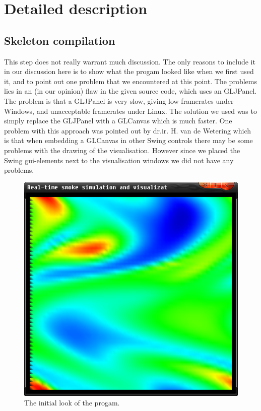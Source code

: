 \documentclass[a4paper,11pt,twoside]{report}
\begin{document}
\chapter{Detailed description}\label{detaileddescription}
	\section{Skeleton compilation}
		This step does not really warrant much discussion. The only reasons to include it in our discussion here is to show what the progam looked like when we first used it, and to point out one problem that we encountered at this point. The problems lies in an (in our opinion) flaw in the given source code, which uses an GLJPanel. The problem is that a GLJPanel is very slow, giving low framerates under Windows, and unacceptable framerates  under Linux. The solution we used was to simply replace the GLJPanel with a GLCanvas which is much faster. One problem with this approach was pointed out by dr.ir. H. van de Wetering which is that when embedding a GLCanvas in other Swing controls there may be some problems with the drawing of the visualisation. However since we placed the Swing gui-elements next to the visualisation windows we did not have any problems.
		\begin{figure}[h]
		\centering
		\includegraphics[scale=\imagescalefactor]{images/step1.png}
		\caption{The initial look of the progam.}\label{fig:step1}
		\end{figure}
		\newpage
\end{document}
